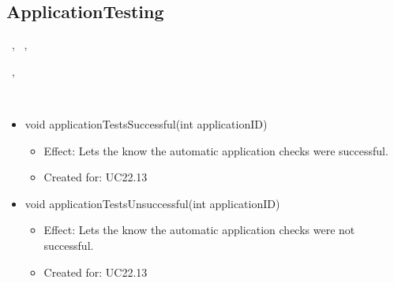   \subsection{ApplicationTesting}\label{int:OnlineServiceOnlineServiceApplicationManagerApplicationManagementLogicApplicationTesting}
    \begin{description}
      \item[Provided by:] \iconcomponent{}~, \iconcomponent{}~, \iconcomponent{}~
      \item[Required by:] \iconcomponent{}~, \iconcomponent{}~
      \item[Operations:] ~
    \begin{itemize}[noitemsep,nolistsep,leftmargin=-.25cm]
      \item \textsf{void applicationTestsSuccessful(int applicationID)}
        \begin{itemize}[noitemsep,nolistsep]
           \item Effect: Lets the  know the automatic application checks were successful.
\item Created for: UC22.13
        \end{itemize}
      \item \textsf{void applicationTestsUnsuccessful(int applicationID)}
        \begin{itemize}[noitemsep,nolistsep]
           \item Effect: Lets the  know the automatic application checks were not successful.
\item Created for: UC22.13
        \end{itemize}
    \end{itemize}
    \end{description}

